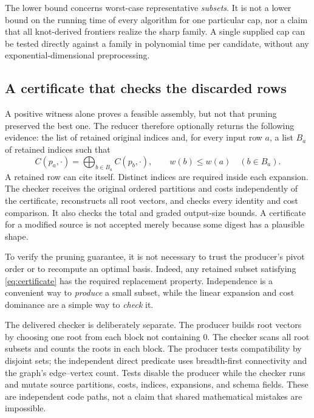 \documentclass[11pt,a4paper]{article}
\theoremstyle{definition}
\theoremstyle{remark}
\begin{document}
The lower bound concerns worst-case representative \emph{subsets}. It is not a
lower bound on the running time of every algorithm for one particular cap, nor a
claim that all knot-derived frontiers realize the sharp family. A single supplied cap
can be tested directly against a family in polynomial time per candidate, without
any exponential-dimensional preprocessing.

\subsection{A certificate that checks the discarded rows}
A positive witness alone proves a feasible assembly, but not that pruning preserved the
best one. The reducer therefore optionally returns the following evidence: the list of
retained original indices and, for every input row $a$, a list $B_a$ of retained indices
such that
\begin{equation}
 C(p_a,\cdot)=\bigoplus_{b\in B_a}C(p_b,\cdot),
 \qquad w(b)\le w(a)\quad(b\in B_a).
 \label{eq:certificate}
\end{equation}
A retained row can cite itself. Distinct indices are required inside each expansion.
The checker receives the original ordered partitions and costs independently of the
certificate, reconstructs all root vectors, and checks every identity and cost comparison.
It also checks the total and graded output-size bounds. A certificate for a modified
source is not accepted merely because some digest has a plausible shape.

To verify the pruning guarantee, it is not necessary to trust the producer's pivot
order or to recompute an optimal basis. Indeed, any retained subset satisfying
\eqref{eq:certificate} has the required replacement property. Independence is a
convenient way to \emph{produce} a small subset, while the linear expansion and
cost dominance are a simple way to \emph{check} it.

The delivered checker is deliberately separate. The producer builds root vectors by
choosing one root from each block not containing $0$. The checker scans all root subsets
and counts the roots in each block. The producer tests compatibility by disjoint sets;
the independent direct predicate uses breadth-first connectivity and the graph's
edge--vertex count. Tests disable the producer while the checker runs and mutate source
partitions, costs, indices, expansions, and schema fields. These are independent code
paths, not a claim that shared mathematical mistakes are impossible.
\end{document}
